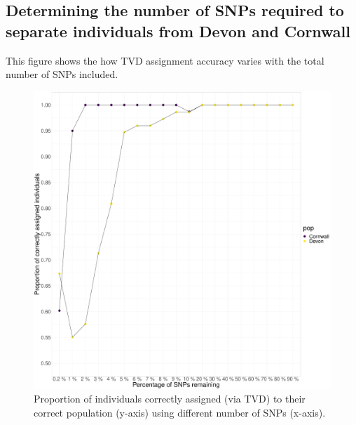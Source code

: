 \subsection{Determining the number of SNPs required to separate individuals from Devon and Cornwall} 
\label{sec:SNP_Count_Assignment_DevCorn}

This figure shows the how TVD assignment accuracy varies with the total number of SNPs included.


\begin{figure}[htp]
    \centering
    \includegraphics[width=1.0\textwidth]{../images/appendix/Devon_Cornwall_TVD_reduced.pdf}
    \caption{Proportion of individuals correctly assigned (via TVD) to their correct population (y-axis) using different number of SNPs (x-axis).}
    \label{fig:Devon_Cornwall_TVD_reduced_assignment}
\end{figure}
